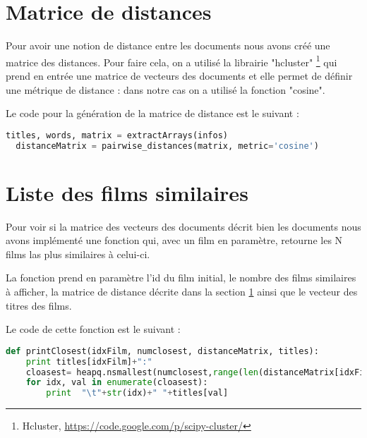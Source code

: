 \section{Matrice de distances}

\label{matrice-distance}
Pour avoir une notion de distance entre les documents nous avons créé une matrice des distances. Pour faire cela, on a utilisé la librairie "hcluster" \footnote{Hcluster, \url{https://code.google.com/p/scipy-cluster/}} qui prend en entrée une matrice de vecteurs des documents et elle permet de définir une métrique de distance : dans notre cas on a utilisé la fonction "cosine".

Le code pour la génération de la matrice de distance est le suivant : \\

\begin{lstlisting}[language=python]
  titles, words, matrix = extractArrays(infos)
  distanceMatrix = pairwise_distances(matrix, metric='cosine')
\end{lstlisting}


\section{Liste des films similaires}

Pour voir si la matrice des vecteurs des documents décrit bien les documents nous avons implémenté une fonction qui, avec un film en paramètre, retourne les N films las plus similaires à celui-ci.

La fonction prend en paramètre l'id du film initial, le nombre des films similaires à afficher, la matrice de distance décrite dans la section \ref{matrice-distance} ainsi que le vecteur des titres des films.

Le code de cette fonction est le suivant : \\

\begin{lstlisting}[language=python]
  def printClosest(idxFilm, numclosest, distanceMatrix, titles):
    print titles[idxFilm]+":"
    cloasest= heapq.nsmallest(numclosest,range(len(distanceMatrix[idxFilm])),distanceMatrix[idxFilm].take)
    for idx, val in enumerate(cloasest):
        print  "\t"+str(idx)+" "+titles[val]
\end{lstlisting}


